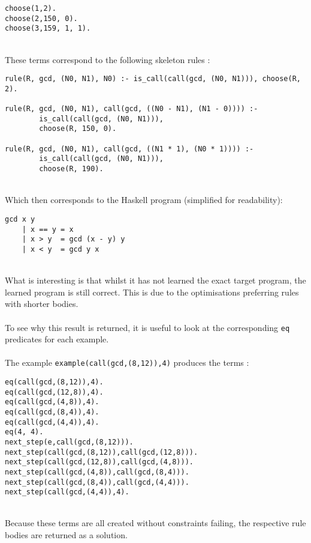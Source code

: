 \begin{lstlisting}
choose(1,2).
choose(2,150, 0).
choose(3,159, 1, 1).
\end{lstlisting}
\mbox{} \\
These terms correspond to the following skeleton rules : \\

\begin{lstlisting}
rule(R, gcd, (N0, N1), N0) :- is_call(call(gcd, (N0, N1))), choose(R, 2). 

rule(R, gcd, (N0, N1), call(gcd, ((N0 - N1), (N1 - 0)))) :- 
		is_call(call(gcd, (N0, N1))), 
		choose(R, 150, 0).

rule(R, gcd, (N0, N1), call(gcd, ((N1 * 1), (N0 * 1)))) :- 
		is_call(call(gcd, (N0, N1))), 
		choose(R, 190).
\end{lstlisting}
\mbox{} \\
Which then corresponds to the Haskell program (simplified for readability):

\begin{lstlisting}
gcd x y
	| x == y = x
	| x > y	 = gcd (x - y) y
	| x < y	 = gcd y x
\end{lstlisting}
\mbox{} \\
What is interesting is that whilst it has not learned the exact target program, the learned program is still correct. This is due to the optimisations preferring rules with shorter bodies.\\ \\
To see why this result is returned, it is useful to look at the corresponding \lstinline{eq} predicates for each example. \\ \\%
The example \lstinline{example(call(gcd,(8,12)),4)} produces the terms :\\ %
\begin{multicols}{2}
\begin{lstlisting}
eq(call(gcd,(8,12)),4). 
eq(call(gcd,(12,8)),4).
eq(call(gcd,(4,8)),4).
eq(call(gcd,(8,4)),4).
eq(call(gcd,(4,4)),4).
eq(4, 4).
next_step(e,call(gcd,(8,12))).
next_step(call(gcd,(8,12)),call(gcd,(12,8))).
next_step(call(gcd,(12,8)),call(gcd,(4,8))).
next_step(call(gcd,(4,8)),call(gcd,(8,4))).
next_step(call(gcd,(8,4)),call(gcd,(4,4))).
next_step(call(gcd,(4,4)),4).
\end{lstlisting}
\end{multicols}
\mbox{}\\
Because these terms are all created without constraints failing, the respective rule bodies are returned as a solution.

